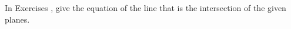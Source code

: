 {\noindent In Exercises}
{, give the equation of the line that is the intersection of the given planes.
}
